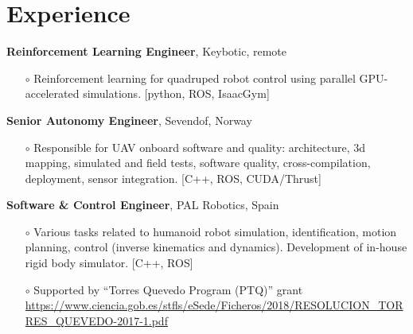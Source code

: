 \documentclass[a4paper,10pt]{report}
\begin{document}
\vspace{0.15cm}
\section{Experience}
\begin{adjustwidth}{0.5cm}{0pt}
%
%
    {\bf {} Reinforcement Learning Engineer}, Keybotic, remote
    \begin{itemize}
        \item[$\circ$] Reinforcement learning for quadruped robot control using
            parallel GPU-accelerated simulations. [python, ROS, IsaacGym]
    \end{itemize}

    \vspace{0.15cm}

    {\bf {} Senior Autonomy Engineer}, Sevendof, Norway
    \begin{itemize}
        \item[$\circ$]  Responsible for UAV onboard software and quality:
            architecture, 3d mapping, simulated and field tests, software
            quality, cross-compilation, deployment, sensor integration. [C++,
            ROS, CUDA/Thrust]
    \end{itemize}

    \vspace{0.15cm}

    {\bf {} Software \& Control Engineer}, PAL Robotics, Spain
    \begin{itemize}
        \item[$\circ$] Various tasks related to humanoid robot simulation,
            identification, motion planning, control (inverse kinematics and
            dynamics). Development of in-house rigid body simulator. [C++, ROS]

        \item[$\circ$] Supported by ``Torres Quevedo Program (PTQ)'' grant \\
            \url{https://www.ciencia.gob.es/stfls/eSede/Ficheros/2018/RESOLUCION_TORRES_QUEVEDO-2017-1.pdf}
    \end{itemize}


\end{adjustwidth}
\end{document}
